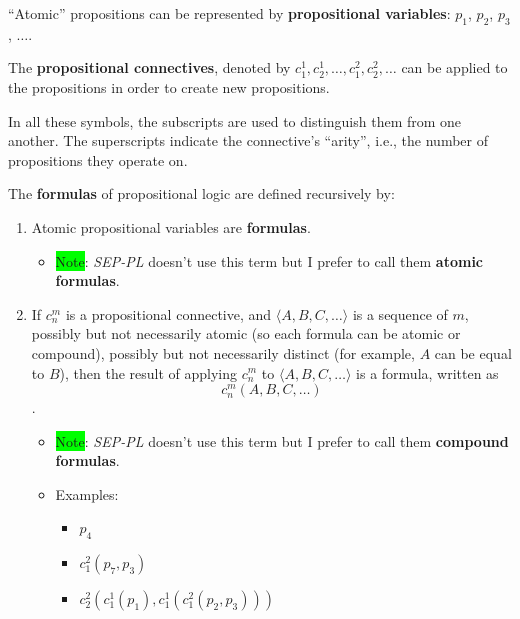 \documentclass[12pt, letterpaper]{article}
\begin{document}
``Atomic'' propositions can be represented by \textbf{propositional variables}:
$p_1$, $p_2$, $p_3$, $\ldots$.

The \textbf{propositional connectives}, denoted by $c_1^1, c_2^1, \ldots, c_1^2,
  c_2^2, \ldots$ can be applied to the propositions in order to create new
propositions.

In all these symbols, the subscripts are used to distinguish them from one
another. The superscripts indicate the connective's ``arity'', i.e., the number
of propositions they operate on.

The \textbf{formulas} of propositional logic are defined recursively by:
\begin{enumerate}
  \item Atomic propositional variables are \textbf{formulas}.
        \begin{itemize}
          \item \colorbox{lime}{Note}: \textit{SEP-PL} doesn't use this term but I prefer
                to call them \textbf{atomic formulas}.
        \end{itemize}

  \item If $c_n^m$ is a propositional connective, and $\langle A, B, C, \ldots
          \rangle$ is a sequence of $m$, possibly but not necessarily atomic (so each
        formula can be atomic or compound), possibly but not necessarily distinct
        (for example, $A$ can be equal to $B$), then the result of applying $c_n^m$
        to $\langle A, B, C, \ldots \rangle$ is a formula, written as \[c_n^m(A, B,
          C, \ldots)\].
        \begin{itemize}
          \item \colorbox{lime}{Note}: \textit{SEP-PL} doesn't use this term but I
                prefer to call them \textbf{compound formulas}.
          \item Examples:
                \begin{itemize}
                  \item $p_4$
                  \item $c_1^2(p_7, p_3)$
                  \item $c_2^2(c_1^1(p_1), c_1^1(c_1^2(p_2, p_3)))$
                \end{itemize}
        \end{itemize}
\end{enumerate}
\end{document}
